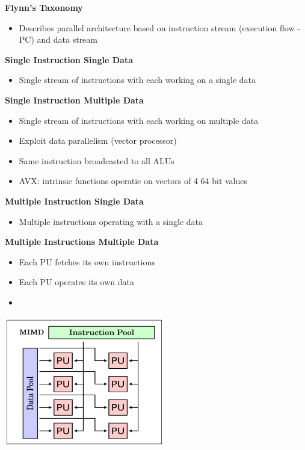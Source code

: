 \documentclass[10pt, landscape]{article}
\begin{document}
\begin{multicols}{4}
\textbf{Flynn's Taxonomy}
\begin{itemize}
    \item Describes parallel architecture based on instruction stream (execution flow - PC) and data stream
\end{itemize}

\textbf{Single Instruction Single Data}
\begin{itemize}
    \item Single stream of instructions with each working on a single data 
\end{itemize}

\textbf{Single Instruction Multiple Data}
\begin{itemize}
    \item Single stream of instructions with each working on multiple data 
    \item Exploit data parallelism (vector processor)
    \item Same instruction broadcasted to all ALUs
    \item AVX: intrinsic functions operatie on vectors of 4 64 bit values 
\end{itemize}

\textbf{Multiple Instruction Single Data}
\begin{itemize}
    \item Multiple instructions operating with a single data 
\end{itemize}

\textbf{Multiple Instructions Multiple Data}
\begin{itemize}
    \item Each PU fetches its  own instructions 
    \item Each PU operates its own data 
    \item  
\end{itemize}
\includegraphics*[width=7cm]{mimd}


\end{multicols}
\end{document}
